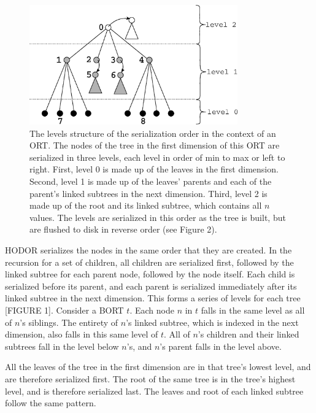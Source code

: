 \documentclass[11pt, oneside]{article}
\begin{document}
\begin{figure}[h!]
    \centering
    \vspace{0.5in}
    \includegraphics[width=0.8\textwidth]{fig1.eps}
    \caption{
        The levels structure of the serialization order in the context of an
        ORT. The nodes of the tree in the first dimension of this ORT are
        serialized in three levels, each level in order of min to max or left
        to right. First, level 0 is made up of the leaves in the first
        dimension.  Second, level 1 is made up of the leaves' parents and each
        of the parent's linked subtrees in the next dimension. Third, level 2
        is made up of the root and its linked subtree, which contains all $n$
        values.  The levels are serialized in this order as the tree is built,
        but are flushed to disk in reverse order (see Figure 2).
    }
    \vspace{0.5in}
\end{figure}

HODOR serializes the nodes in the same order that they are created. In the
recursion for a set of children, all children are serialized first, followed by
the linked subtree for each parent node, followed by the node itself. Each
child is serialized before its parent, and each parent is serialized
immediately after its linked subtree in the next dimension. This forms a series
of levels \cite{seinfeld} for each tree [FIGURE 1]. Consider a BORT $t$. Each
node $n$ in $t$ falls in the same level as all of $n$'s siblings. The entirety
of $n$'s linked subtree, which is indexed in the next dimension, also falls in
this same level of $t$. All of $n$'s children and their linked subtrees fall in
the level below $n$'s, and $n$'s parent falls in the level above. 

All the leaves of the tree in the first dimension are in that tree's lowest
level, and are therefore serialized first. The root of the same tree is in the
tree's highest level, and is therefore serialized last. The leaves and root of
each linked subtree follow the same pattern. 
\end{document}
